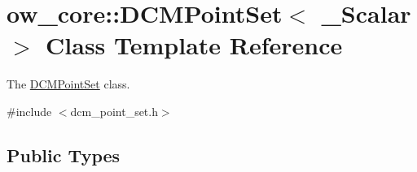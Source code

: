 \hypertarget{classow__core_1_1DCMPointSet}{}\section{ow\+\_\+core\+:\+:D\+C\+M\+Point\+Set$<$ \+\_\+\+Scalar $>$ Class Template Reference}
\label{classow__core_1_1DCMPointSet}


The \hyperlink{classow__core_1_1DCMPointSet}{D\+C\+M\+Point\+Set} class.  




{\ttfamily \#include $<$dcm\+\_\+point\+\_\+set.\+h$>$}

\subsection*{Public Types}
